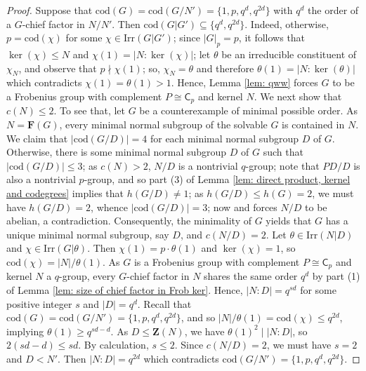 \documentclass[9pt]{article}
\begin{document}
\begin{proof}
	 
	 
	  

	 Suppose that $\mathrm{cod}(G)=\mathrm{cod}(G/N')=\{1,p, q^{d}, q^{2d} \}$ with $q^{d}$ the order of a $G$-chief factor in $N/N'$.
     Then $\mathrm{cod}(G|G')\subseteq \{ q^{d},q^{2d} \}$.
	 Indeed, otherwise, $p=\mathrm{cod}(\chi)$ for some $\chi \in \mathrm{Irr}(G|G')$;
	 since $|G|_p=p$, it follows that $\ker(\chi)\leq N$ and $\chi(1)=|N:\ker(\chi)|$;
	 let $\theta$ be an irreducible constituent of $\chi_N$, and observe that $p\nmid \chi(1)$;
	 so, $\chi_N=\theta$ and therefore $\theta(1)=|N:\ker(\theta)|$ which contradicts $\chi(1)=\theta(1)>1$.
      Hence, Lemma \ref{lem: qww} forces $G$ to be a Frobenius group with complement $P\cong \mathsf{C}_{p}$ and kernel $N$.
	 We next show that $c(N)\leq 2$.
     To see that, let $G$ be a counterexample of minimal possible order.
	 As $N=\mathbf{F}(G)$,
	 every minimal normal subgroup of the solvable $G$ is contained in $N$.
     We claim that $|\mathrm{cod}(G/D)|=4$ for each minimal normal subgroup $D$ of $G$.
	 Otherwise, there is some minimal normal subgroup $D$ of $G$ such that $|\mathrm{cod}(G/D)|\leq 3$; 
	 as $c(N)>2$, $N/D$ is a nontrivial $q$-group;
	 note that $PD/D$ is also a nontrivial $p$-group, and so part (3) of Lemma \ref{lem: direct product, kernel and codegrees} implies that $h(G/D)\neq 1$;
	 as $h(G/D)\leq h(G)=2$, we must have $h(G/D)=2$, whence $|\mathrm{cod}(G/D)|=3$; 
	 now \cite[Theorem 3.4]{alizadeh2019} and \cite[Theorem 0.1]{alizadeh2022}
	 forces $N/D$ to be abelian, a contradiction.
	 Consequently, the minimality of $G$ yields that $G$ has a unique minimal normal subgroup, say $D$, and $c(N/D)=2$.
	 Let $\theta\in \mathrm{Irr}(N|D)$ and $\chi\in \mathrm{Irr}(G|\theta)$.
	 Then $\chi(1)=p\cdot \theta(1)$ and $\ker(\chi)=1$,
	 so $\mathrm{cod}(\chi)=|N|/\theta(1)$.
	 As $G$ is a Frobenius group with complement $P\cong \mathsf{C}_{p}$ and kernel $N$ a $q$-group, every $G$-chief factor in $N$ shares the same order $q^{d}$ by part (1) of Lemma \ref{lem: size of chief factor in Frob ker}.
      Hence, $|N:D|=q^{sd}$ for some positive integer $s$ and $|D|=q^{d}$.
	 Recall that $\mathrm{cod}(G)=\mathrm{cod}(G/N')=\{ 1,p,q^{d},q^{2d} \}$,
	 and so $|N|/\theta(1)=\mathrm{cod}(\chi)\leq q^{2d}$, implying $\theta(1)\geq q^{sd-d}$.
	 As $D\leq \mathbf{Z}(N)$, we have $\theta(1)^{2}\mid |N:D|$, so $2(sd-d)\leq sd$.
	 By calculation, $s\leq 2$.
	 Since $c(N/D)=2$, we must have $s=2$ and $D<N'$.
     Then $|N:D|=q^{2d}$ which contradicts $\mathrm{cod}(G/N')=\{ 1,p,q^{d},q^{2d} \}$.
\end{proof}
\end{document}
